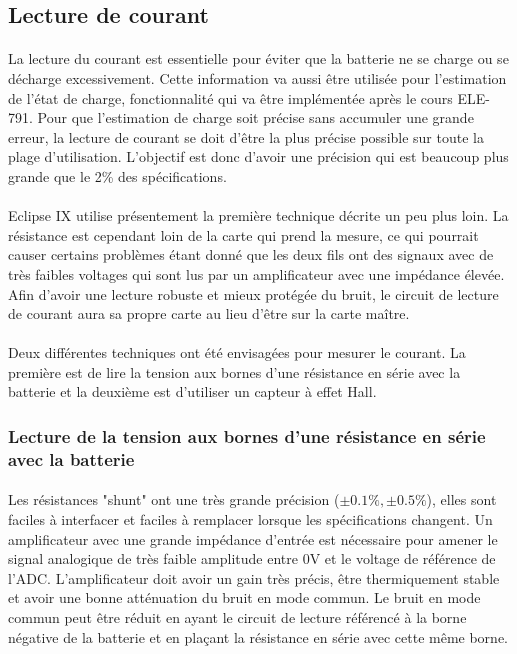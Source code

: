\subsection{Lecture de courant}
	\paragraph*{}
	La lecture du courant est essentielle pour éviter que la batterie ne se charge ou se décharge excessivement. Cette information va aussi être utilisée pour l'estimation de l'état de charge, fonctionnalité qui va être implémentée après le cours ELE-791. Pour que l'estimation de charge soit précise sans accumuler une grande erreur, la lecture de courant se doit d'être la plus précise possible sur toute la plage d'utilisation. L'objectif est donc d'avoir une précision qui est beaucoup plus grande que le 2\% des spécifications. 
	
	\paragraph*{}
	Eclipse IX utilise présentement la première technique décrite un peu plus loin. La résistance est cependant loin de la carte qui prend la mesure, ce qui pourrait causer certains problèmes étant donné que les deux fils ont des signaux avec de très faibles voltages qui sont lus par un amplificateur avec une impédance élevée. Afin d'avoir une lecture robuste et mieux protégée du bruit, le circuit de lecture de courant aura sa propre carte au lieu d'être sur la carte maître.
	
	\paragraph*{}
	Deux différentes techniques ont été envisagées pour mesurer le courant. La première est de lire la tension aux bornes d'une résistance en série avec la batterie et la deuxième est d'utiliser un capteur à effet Hall. 
	
	
	\subsubsection*{Lecture de la tension aux bornes d'une résistance en série avec la batterie}
	\paragraph*{}
	Les résistances "shunt" ont une très grande précision ($\pm 0.1 \% , \pm 0.5 \%$), elles sont faciles à interfacer et faciles à remplacer lorsque les spécifications changent. Un amplificateur avec une grande impédance d'entrée est nécessaire pour amener le signal analogique de très faible amplitude entre 0V et le voltage de référence de l'ADC. L'amplificateur doit avoir un gain très précis, être thermiquement stable et avoir une bonne atténuation du bruit en mode commun. Le bruit en mode commun peut être réduit en ayant le circuit de lecture référencé à la borne négative de la batterie et en plaçant la résistance en série avec cette même borne.
		
